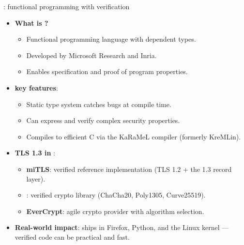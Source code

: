 \ifdefined\PRESENTATION\else\PassOptionsToClass{handout}{beamer}\fi\documentclass[aspectratio=169, lualatex]{beamer}
\begin{document}
\begin{frame}{\fstar: functional programming with verification}
	\begin{itemize}
		\item \textbf{What is \fstar?}
		      \begin{itemize}
			      \item Functional programming language with dependent types.
			      \item Developed by Microsoft Research and Inria.
			      \item Enables specification and proof of program properties.
		      \end{itemize}
		\item \textbf{\fstar key features}:
		      \begin{itemize}
			      \item Static type system catches bugs at compile time.
			      \item Can express and verify complex security properties.
			      \item Compiles to efficient C via the KaRaMeL compiler (formerly KreMLin).
		      \end{itemize}
		\item \textbf{TLS 1.3 in \fstar}:
		      \begin{itemize}
			      \item \textbf{miTLS}: verified reference implementation (TLS 1.2 + the 1.3 record layer).
			      \item \textbf{\haclstar}: verified crypto library (ChaCha20, Poly1305, Curve25519).
			      \item \textbf{EverCrypt}: agile crypto provider with algorithm selection.
		      \end{itemize}
		\item \textbf{Real-world impact}: \haclstar ships in Firefox, Python, and the Linux kernel --- verified code can be practical and fast.
	\end{itemize}
\end{frame}
\end{document}
